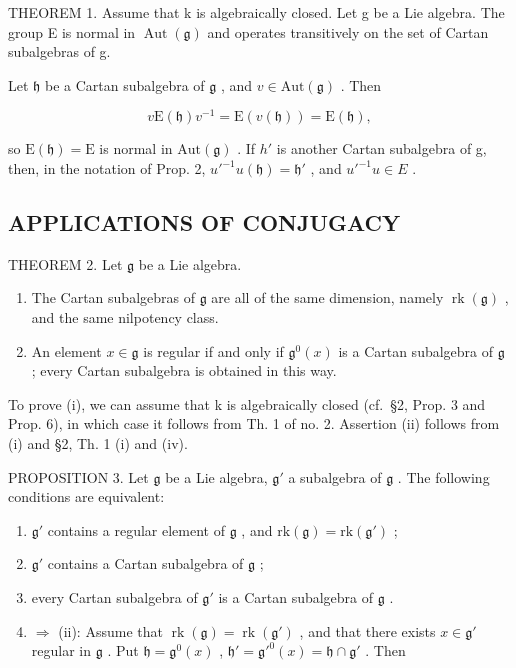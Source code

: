 THEOREM 1. Assume that k is algebraically closed. Let g be a Lie algebra. The group E is normal in \(\operatorname{Aut}(\mathfrak{g})\) and operates transitively on the set of Cartan subalgebras of g.

Let \(\mathfrak{h}\) be a Cartan subalgebra of \(\mathfrak{g}\) , and \(v\in\mathrm{Aut}(\mathfrak{g})\) . Then

\[
v \mathrm{E} (\mathfrak {h}) v ^ {- 1} = \mathrm{E} (v (\mathfrak {h})) = \mathrm{E} (\mathfrak {h}),
\]

so \(\mathrm{E}(\mathfrak{h}) = \mathrm{E}\) is normal in \(\mathrm{Aut}(\mathfrak{g})\) . If \(h'\) is another Cartan subalgebra of g, then, in the notation of Prop. 2, \(u'^{-1}u(\mathfrak{h}) = \mathfrak{h}'\) , and \(u'^{-1}u \in E\) .

\subsection{APPLICATIONS OF CONJUGACY}

THEOREM 2. Let \(\mathfrak{g}\) be a Lie algebra.

\begin{enumerate}
\def\labelenumi{(\roman{enumi})}
\item
  The Cartan subalgebras of \(\mathfrak{g}\) are all of the same dimension, namely \(\operatorname{rk}(\mathfrak{g})\) , and the same nilpotency class.
\item
  An element \(x \in \mathfrak{g}\) is regular if and only if \(\mathfrak{g}^0(x)\) is a Cartan subalgebra of \(\mathfrak{g}\) ; every Cartan subalgebra is obtained in this way.
\end{enumerate}

To prove (i), we can assume that k is algebraically closed (cf.~§2, Prop. 3 and Prop. 6), in which case it follows from Th. 1 of no. 2. Assertion (ii) follows from (i) and §2, Th. 1 (i) and (iv).

PROPOSITION 3. Let \(\mathfrak{g}\) be a Lie algebra, \(\mathfrak{g}'\) a subalgebra of \(\mathfrak{g}\) . The following conditions are equivalent:

\begin{enumerate}
\def\labelenumi{(\roman{enumi})}
\item
  \(\mathfrak{g}'\) contains a regular element of \(\mathfrak{g}\) , and \(\mathrm{rk}(\mathfrak{g}) = \mathrm{rk}(\mathfrak{g}')\) ;
\item
  \(\mathfrak{g}'\) contains a Cartan subalgebra of \(\mathfrak{g}\) ;
\item
  every Cartan subalgebra of \(\mathfrak{g}'\) is a Cartan subalgebra of \(\mathfrak{g}\) .
\item
  \(\Longrightarrow\) (ii): Assume that \(\operatorname{rk}(\mathfrak{g}) = \operatorname{rk}(\mathfrak{g}')\) , and that there exists \(x \in \mathfrak{g}'\) regular in \(\mathfrak{g}\) . Put \(\mathfrak{h} = \mathfrak{g}^0(x)\) , \(\mathfrak{h}' = \mathfrak{g}'^0(x) = \mathfrak{h} \cap \mathfrak{g}'\) . Then
\end{enumerate}

